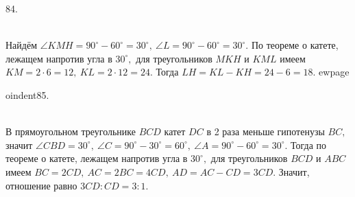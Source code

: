 84. \begin{figure}[ht!]
\end{figure}\\
Найдём $\angle KMH=90^\circ-60^\circ=30^\circ,\ \angle L=90^\circ-60^\circ=30^\circ.$ По теореме о катете, лежащем напротив угла в $30^\circ,$ для треугольников $MKH$ и $KML$ имеем $KM=2\cdot6=12,\ KL=2\cdot12=24.$ Тогда $LH=KL-KH=24-6=18.$
ewpage

oindent85. \begin{figure}[ht!]
\end{figure}\\
В прямоугольном треугольнике $BCD$ катет $DC$ в 2 раза меньше гипотенузы $BC,$ значит $\angle CBD=30^\circ,\ \angle C=90^\circ-30^\circ=60^\circ,\ \angle A=90^\circ-60^\circ=30^\circ.$ Тогда по теореме о катете, лежащем напротив угла в $30^\circ,$ для треугольников $BCD$ и $ABC$ имеем $BC=2CD,\ AC=2BC=4CD,\ AD=AC-CD=3CD.$ Значит, отношение равно $3CD:CD=3:1.$\\
